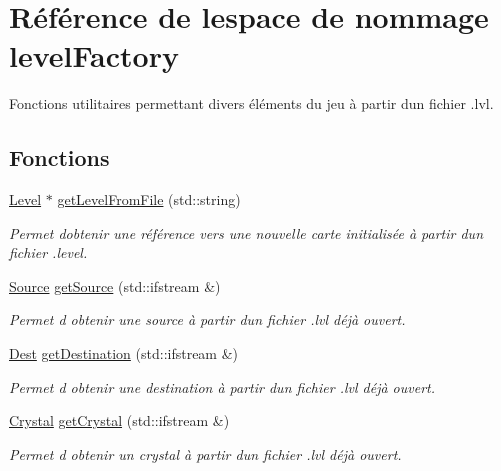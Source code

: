 \hypertarget{namespacelevelFactory}{}\section{Référence de l\textquotesingle{}espace de nommage level\+Factory}
\label{namespacelevelFactory}


Fonctions utilitaires permettant divers éléments du jeu à partir d\textquotesingle{}un fichier .lvl.  


\subsection*{Fonctions}
\begin{DoxyCompactItemize}
\item 
\hyperlink{classLevel}{Level} $\ast$ \hyperlink{namespacelevelFactory_a6f72186d33354f4f19b83f510e4bdb10}{get\+Level\+From\+File} (std\+::string)
\begin{DoxyCompactList}\small\item\em Permet d\textquotesingle{}obtenir une référence vers une nouvelle carte initialisée à partir d\textquotesingle{}un fichier .level. \end{DoxyCompactList}\item 
\hyperlink{classSource}{Source} \hyperlink{namespacelevelFactory_ac9bd1e2b73944b567d2b454ad861efc0}{get\+Source} (std\+::ifstream \&)
\begin{DoxyCompactList}\small\item\em Permet d\textquotesingle{} obtenir une source à partir d\textquotesingle{}un fichier .lvl déjà ouvert. \end{DoxyCompactList}\item 
\hyperlink{classDest}{Dest} \hyperlink{namespacelevelFactory_ab725f4fefde6c96197b6baf7c0eadfc7}{get\+Destination} (std\+::ifstream \&)
\begin{DoxyCompactList}\small\item\em Permet d\textquotesingle{} obtenir une destination à partir d\textquotesingle{}un fichier .lvl déjà ouvert. \end{DoxyCompactList}\item 
\hyperlink{classCrystal}{Crystal} \hyperlink{namespacelevelFactory_a4a9434297ea3998d9466a0f11407c041}{get\+Crystal} (std\+::ifstream \&)
\begin{DoxyCompactList}\small\item\em Permet d\textquotesingle{} obtenir un crystal à partir d\textquotesingle{}un fichier .lvl déjà ouvert. \end{DoxyCompactList}\item 

\end{DoxyCompactItemize}
